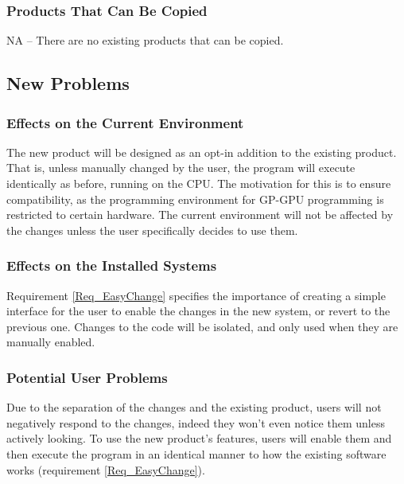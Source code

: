 \documentclass[12pt]{article}
\newcommand{\todo}[1]{\textcolor{red}{[TODO: #1]}} \else
\newcommand{\authornote}[3]{} \newcommand{\todo}[1]{} \fi
\newcommand{\ds}[1]{\authornote{blue}{DS}{#1}} %
\begin{document}
\subsubsection{Products That Can Be Copied}
NA -- There are no existing products that can be copied.

\subsection{New Problems}\label{SubSec_NewProbs} %
\subsubsection{Effects on the Current Environment}
The new product will be designed as an opt-in addition to the existing product. That is, unless manually changed by the user, the program will execute identically as before, running on the CPU. The motivation for this is to ensure compatibility, as the programming environment for GP-GPU programming is restricted to certain hardware. The current environment will not be affected by the changes unless the user specifically decides to use them.
\ds{You are describing design decisions, not effects on the current environment}

\subsubsection{Effects on the Installed Systems}
Requirement \ref{Req_EasyChange} specifies the importance of creating a simple interface for the user to enable the changes in the new system, or revert to the previous one. Changes to the code will be isolated, and only used when they are manually enabled.
\ds{Again you are talking about design. Here you should be detailing what your
how your product interfaces with the existing system. Are there any potential
conflicts that would need to be solved (i.e. by your design decision)?}

\subsubsection{Potential User Problems}
Due to the separation of the changes and the existing product, users will not negatively respond to the changes, indeed they won't even notice them unless actively looking. To use the new product's features, users will enable them and then execute the program in an identical manner to how the existing software works (requirement \ref{Req_EasyChange}).
\ds{You are again making design decisions instead of detailing potential problems
to be solved by those decisions}
\end{document}
